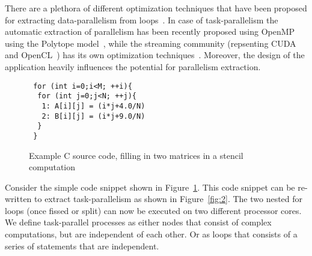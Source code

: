 \documentclass[10pt, conference, compsocconf]{IEEEtran}
\begin{document}

There are a plethora of different optimization techniques that have been
proposed for extracting data-parallelism from
loops~\cite{smuc97,mgri98}. In case of task-parallelism the automatic
extraction of parallelism has been recently proposed using OpenMP using
the Polytope model~\cite{mgri98}, while the streaming community
(repsenting CUDA~\cite{jsan10} and OpenCL~\cite{opencl08}) has its own
optimization techniques~\cite{mgor06}. Moreover, the design of the
application heavily influences the potential for parallelism extraction.


\begin{figure}[h!]
  \centering
  \small{
\begin{verbatim}
 for (int i=0;i<M; ++i){
  for (int j=0;j<N; ++j){
   1: A[i][j] = (i*j+4.0/N)
   2: B[i][j] = (i*j+9.0/N)
  }
 }
\end{verbatim}
  }
  \caption{Example C source code, filling in two matrices in a stencil
    computation}
  \label{fig:1}
\end{figure}

Consider the simple code snippet shown in Figure~\ref{fig:1}. This code
snippet can be re-written to extract task-parallelism as shown in
Figure~\ref{fig:2}. The two nested for loops (once fissed or split) can
now be executed on two different processor cores. We define
task-parallel processes as either nodes that consist of complex
computations, but are independent of each other. Or as loops that
consists of a series of statements that are independent.
\end{document}
